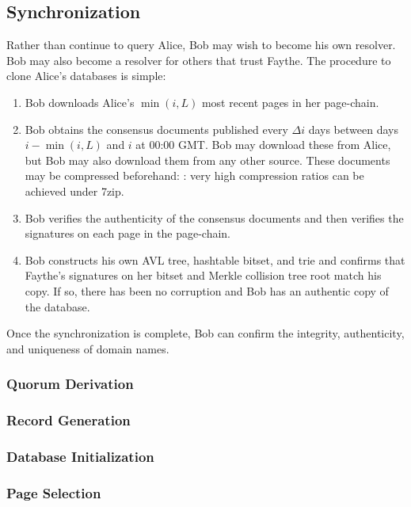 \subsection{Synchronization}
\label{sec:Synchronization}

Rather than continue to query Alice, Bob may wish to become his own resolver. Bob may also become a resolver for others that trust Faythe. The procedure to clone Alice's databases is simple:

\begin{enumerate}
	\item Bob downloads Alice's $ \min(i,L) $ most recent pages in her page-chain.
	\item Bob obtains the consensus documents published every $ \Delta i $ days between days $ i - \min(i,L) $ and $ i $ at 00:00 GMT. Bob may download these from Alice, but Bob may also download them from any other source. These documents may be compressed beforehand: : very high compression ratios can be achieved under 7zip.
	\item Bob verifies the authenticity of the consensus documents and then verifies the signatures on each page in the page-chain.
	\item Bob constructs his own AVL tree, hashtable bitset, and trie and confirms that Faythe's signatures on her bitset and Merkle collision tree root match his copy. If so, there has been no corruption and Bob has an authentic copy of the database.
\end{enumerate}

Once the synchronization is complete, Bob can confirm the integrity, authenticity, and uniqueness of domain names.

\subsubsection{Quorum Derivation}

\subsubsection{Record Generation}

\subsubsection{Database Initialization}

\subsubsection{Page Selection}

